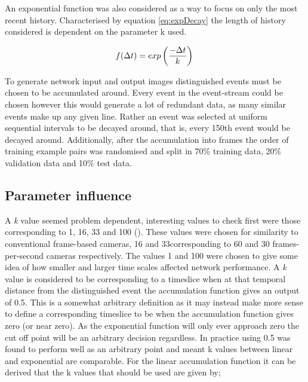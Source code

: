 An exponential function was also considered as a way to focus on only the most recent history.
Characterised by equation \ref{eq:expDecay} the length of history considered is dependent on the parameter k used. 

\begin{equation}
 \label{eq:expDecay}
    f(\Delta t) = exp\left(\frac{-\Delta t}{k}\right) \\
\end{equation}


To generate network input and output images distinguished events must be chosen to be accumulated around.
Every event in the event-stream could be chosen however this would generate a lot of redundant data, as many similar events make up any given line.
Rather an event was selected at uniform sequential intervals to be decayed around, that is, every 150th event would be decayed around. 
Additionally, after the accumulation into frames the order of training example pairs was randomised and split in 70\% training data, 20\% validation data and 10\% test data. 


\subsection{Parameter influence}
A \textit{k} value seemed problem dependent, interesting values to check first were those corresponding to 1, 16, 33 and 100 (\ms). These values were chosen for similarity to conventional frame-based cameras, 16 and 33\ms corresponding to 60 and 30 frames-per-second cameras respectively. 
The values 1 and 100 \ms were chosen to give some idea of how smaller and larger time scales affected network performance. 
A \textit{k} value is considered to be corresponding to a timeslice when at that temporal distance from the distinguished event the accumulation function gives an output of 0.5.
This is a somewhat arbitrary definition as it may instead make more sense to define a corresponding timeslice to be when the accumulation function gives zero (or near zero). 
As the exponential function will only ever approach zero the cut off point will be an arbitrary decision regardless.
In practice using 0.5 was found to perform well as an arbitrary point and meant k values between linear and exponential are comparable.
For the linear accumulation function it can be derived that the k values that should be used are given by;

